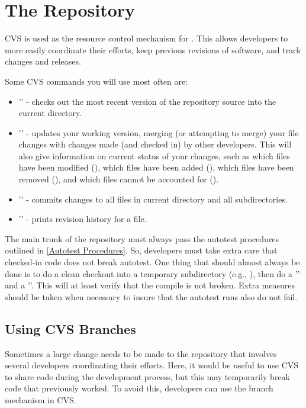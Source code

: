 \chapter{The Repository}
\label{The Repository}

CVS is used as the resource control mechanism for \hypre{}.  This
allows developers to more easily coordinate their efforts, keep
previous revisions of software, and track changes and releases.

Some CVS commands you will use most often are:
\begin{itemize}
\item '' - checks out the most
recent version of the repository source into the current directory.
\item '' - updates your working version, merging
(or attempting to merge) your file changes with changes made (and
checked in) by other developers.  This will also give information on
current status of your changes, such as which files have been modified
(), which files have been added (), which files have
been removed (), and which files cannot be accounted for
().
\item '' - commits changes to all files in current
directory and all subdirectories.
\item '' - prints revision history for a file.
\end{itemize}

The main trunk of the repository must always pass the autotest
procedures outlined in \ref{Autotest Procedures}.  So, developers must
take extra care that checked-in code does not break autotest.  One
thing that should almost always be done is to do a clean checkout into
a temporary subdirectory (e.g., ), then do a
'' and a ''.  This will at least
verify that the compile is not broken.  Extra measures should be taken
when necessary to insure that the autotest runs also do not fail.

\section{Using CVS Branches}
\label{Using CVS Branches}

Sometimes a large change needs to be made to the repository that
involves several developers coordinating their efforts.  Here, it
would be useful to use CVS to share code during the development
process, but this may temporarily break code that previously worked.
To avoid this, developers can use the branch mechanism in CVS.

